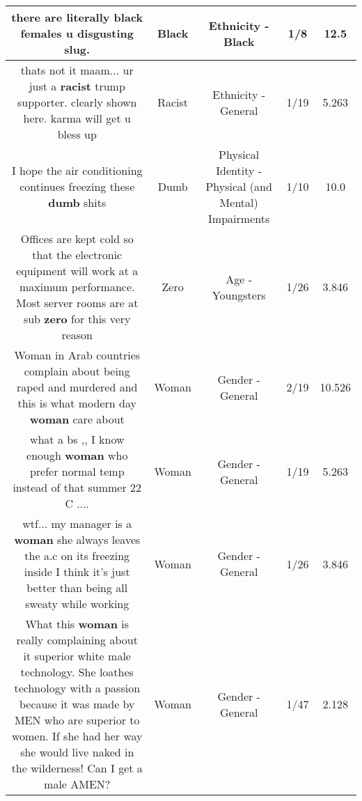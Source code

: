 \documentclass[11pt]{article}
\newlength\mylength
\begin{document}
\begin{center}
\begin{longtable}{|C{.65\mylength}|C{.30\mylength}|C{.12\mylength}|C{.12\mylength}|C{.12\mylength}|}
  \small there are literally \textbf{black} females u disgusting slug.\normalsize   & Black & Ethnicity - Black & 1/8 & 12.5 \\  \hline
  \small thats not it maam... ur just a \textbf{racist} trump supporter. clearly shown here. karma will get u bless up\normalsize   & Racist & Ethnicity - General & 1/19 & 5.263 \\  \hline
  \small I hope the air conditioning continues freezing these \textbf{dumb} shits\normalsize   & Dumb & Physical Identity - Physical (and Mental) Impairments & 1/10 & 10.0 \\  \hline
  \small Offices are kept cold so that the electronic equipment will work at a maximum performance. Most server rooms are at sub \textbf{zero} for this very reason\normalsize   & Zero & Age - Youngsters & 1/26 & 3.846 \\  \hline
  \small Woman in Arab countries complain about being raped and murdered and this is what modern day \textbf{woman} care about\normalsize   & Woman & Gender - General & 2/19 & 10.526 \\  \hline
  \small what a bs ,,  I know enough \textbf{woman}  who prefer normal temp instead of that summer 22 C ....\normalsize   & Woman & Gender - General & 1/19 & 5.263 \\  \hline
  \small wtf... my manager is a \textbf{woman} she always leaves the a.c on its freezing inside I think it's just better than being all sweaty while working\normalsize   & Woman & Gender - General & 1/26 & 3.846 \\  \hline
  \small What this \textbf{woman} is really complaining about it superior white male technology. She loathes technology with a passion because it was made by MEN who are superior to women. If she had her way she would live naked in the wilderness! Can I get a male AMEN?\normalsize   & Woman & Gender - General & 1/47 & 2.128 \\  \hline

\end{longtable}
\end{center}
\end{document}
